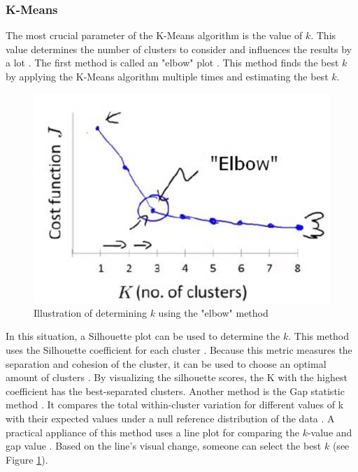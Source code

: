 \subsubsection{K-Means} \label{theory:kmeans}
The most crucial parameter of the K-Means algorithm is the value of $k$.
This value determines the number of clusters to consider and influences the results by a lot \citep{ahmed_k-means_2020}.
The first method is called an "elbow" plot \citep{kodinariya_review_2013}.
This method finds the best $k$ by applying the K-Means algorithm multiple times and estimating the best $k$.
\begin{figure}
    \includegraphics{TheorethicalFramework/dentification-of-Elbow-point.png}
    \caption{Illustration of determining $k$ using the "elbow" method \citep{kodinariya_review_2013}}
    \label{elbow-method}
\end{figure}
In this situation, a Silhouette plot can be used to determine the $k$.
This method uses the Silhouette coefficient for each cluster \citep{saputra_effect_2020}.
Because this metric measures the separation and cohesion of the cluster, it can be used to choose an optimal amount of clusters \citep{saputra_effect_2020}.
By visualizing the silhouette scores, the K with the highest coefficient has the best-separated clusters. \newline
Another method is the Gap statistic method \citep{yuan_research_2019}.
It compares the total within-cluster variation for different values of k with their expected values under a null reference distribution of the data \citep{tibshirani_estimating_2001}.
A practical appliance of this method uses a line plot for comparing the $k$-value and gap value \citep{yuan_research_2019}.
Based on the line's visual change, someone can select the best $k$ (see Figure \ref{elbow-method}).


